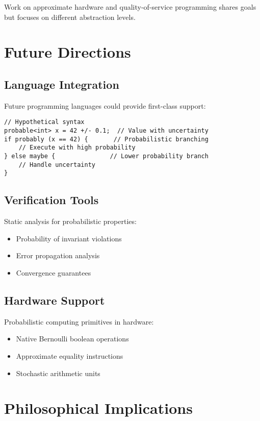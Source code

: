 \documentclass[11pt,final,hidelinks]{article}
\begin{document}
{Work on approximate hardware \cite{han2013} and quality-of-service programming \cite{hoffmann2011} shares goals but focuses on different abstraction levels.

\section{Future Directions}

\subsection{Language Integration}

Future programming languages could provide first-class support:

\begin{verbatim}
// Hypothetical syntax
probable<int> x = 42 +/- 0.1;  // Value with uncertainty
if probably (x == 42) {       // Probabilistic branching
    // Execute with high probability
} else maybe {               // Lower probability branch
    // Handle uncertainty
}
\end{verbatim}

\subsection{Verification Tools}

Static analysis for probabilistic properties:
\begin{itemize}
    \item Probability of invariant violations
    \item Error propagation analysis
    \item Convergence guarantees
\end{itemize}

\subsection{Hardware Support}

Probabilistic computing primitives in hardware:
\begin{itemize}
    \item Native Bernoulli boolean operations
    \item Approximate equality instructions
    \item Stochastic arithmetic units
\end{itemize}

\section{Philosophical Implications}

}
\end{document}
